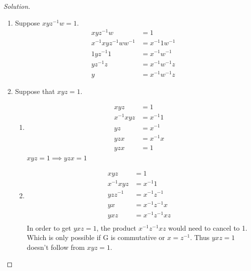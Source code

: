 \documentclass{article}
\newenvironment{solution}
{\renewcommand\qedsymbol{$\blacksquare$}\begin{proof}[Solution]}
{\end{proof}}
\begin{document}
\begin{solution}
    \begin{enumerate}
        \item Suppose $xyz^{-1}w = 1$.
        \begin{align*}{}
            xyz^{-1}w &= 1 \\
            x^{-1}xyz^{-1}ww^{-1} &= x^{-1}1w^{-1} \\
            1yz^{-1}1 &= x^{-1}w^{-1}\\
            yz^{-1}z &= x^{-1}w^{-1}z \\
            y &= x^{-1}w^{-1}z
        \end{align*}
        \item Suppose that $xyz = 1$.
        \begin{enumerate}{}
            \item \begin{align*}{}
                xyz &= 1 \\
                x^{-1}xyz &= x^{-1}1 \\
                yz &= x^{-1} \\
                yzx &= x^{-1}x \\
                yzx &= 1
            \end{align*}
            $xyz = 1 \implies yzx = 1$
            \item \begin{align*}{}
                xyz &= 1 \\
                x^{-1}xyz &= x^{-1}1 \\
                yzz^{-1} &= x^{-1}z^{-1} \\
                yx &= x^{-1}z^{-1}x \\
                yxz &= x^{-1}z^{-1}xz \\
            \end{align*}
            In order to get $yxz = 1$, the product $x^{-1}z^{-1}xz$ would need to cancel to 1. Which is only possible if G is commutative or $x = z^{-1}$. Thus $yxz = 1$ doesn't follow from $xyz = 1$.
        \end{enumerate}
    \end{enumerate}
\end{solution}

\bigskip
\end{document}
